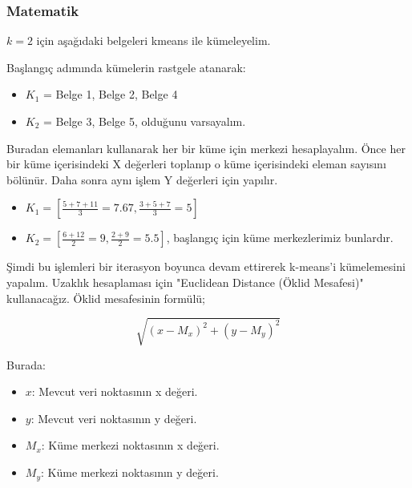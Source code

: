\newpage

\subsubsection{Matematik}

$k = 2$ için aşağıdaki belgeleri kmeans ile kümeleyelim.

\begin{table}[h]
    \centering
    {\scriptsize\renewcommand{\arraystretch}{0.3}
    {}}
\end{table}

Başlangıç adımında kümelerin rastgele atanarak:
\begin{itemize}
    \item $K_1$ = Belge 1, Belge 2, Belge 4
    \item $K_2$ = Belge 3, Belge 5, olduğunu varsayalım.
\end{itemize}

Buradan elemanları kullanarak her bir küme için merkezi hesaplayalım. Önce her bir küme içerisindeki X değerleri toplanıp o küme içerisindeki eleman sayısını bölünür. Daha sonra aynı işlem Y değerleri için yapılır.

\begin{itemize}
    \item $K_1 = [\frac{5 + 7 + 11}{3} = 7.67, \frac{3 + 5 + 7}{3} = 5]$
    \item $K_2 = [\frac{6 + 12}{2} = 9, \frac{2 + 9}{2} = 5.5]$, başlangıç için küme merkezlerimiz bunlardır.
\end{itemize}

Şimdi bu işlemleri bir iterasyon boyunca devam ettirerek k-means'i kümelemesini yapalım. Uzaklık hesaplaması için "Euclidean Distance (Öklid Mesafesi)" kullanacağız. Öklid mesafesinin formülü;

\[ \sqrt{(x - M_x)^2 + (y - M_y)^2} \]

Burada:
\begin{itemize}
    \item $x$: Mevcut veri noktasının x değeri.
    \item $y$: Mevcut veri noktasının y değeri.
    \item $M_x$: Küme merkezi noktasının x değeri.
    \item $M_y$: Küme merkezi noktasının y değeri.
\end{itemize}

